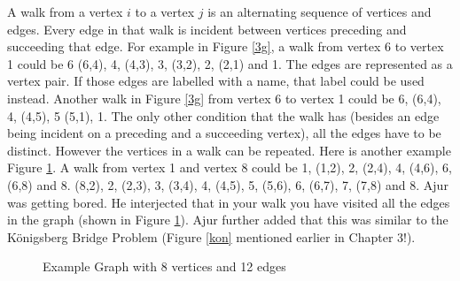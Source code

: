 A walk from a vertex $i$ to a vertex $j$ is an alternating sequence of vertices and edges. Every edge in that walk is incident between vertices preceding and succeeding that edge. For example in Figure \ref{3g},
a walk from vertex 6 to vertex 1 could be 6 (6,4), 4, (4,3), 3, (3,2), 2, (2,1) and 1. The edges are represented as a vertex pair. If those edges are labelled with a name, that label could be used instead. Another walk in Figure \ref{3g} from vertex 6 to vertex 1 could be 6, (6,4), 4, (4,5), 5 (5,1), 1.  The only other condition that the walk has (besides an edge being incident on a preceding and a succeeding vertex), all the edges have to be distinct. However the vertices in a walk can be repeated. 
Here is another example Figure \ref{3g3}. A walk from vertex 1 and vertex 8 could be 1, (1,2), 2, (2,4), 4, (4,6), 6, (6,8) and 8. (8,2), 2, (2,3), 3, (3,4), 4, (4,5), 5, (5,6), 6, (6,7), 7, (7,8) and 8. Ajur was getting bored. He interjected that in your walk you have visited all the edges in the graph (shown in Figure \ref{3g3}). Ajur further added that this was similar to the K\"{o}nigsberg Bridge Problem (Figure \ref{kon} mentioned earlier in Chapter 3!).  
\begin{figure}
\begin{center}
\caption{ Example Graph with 8 vertices and 12 edges}\label{3g3}
\end{center}
\end{figure}
\\

